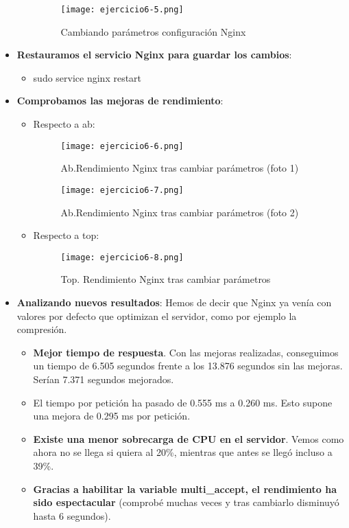\begin{itemize}
\begin{itemize}
			\begin{figure}[H] 
				\centering
				\texttt{[image: ejercicio6-5.png]} 
				\label{figura31} 
				\caption{Cambiando parámetros configuración Nginx}
			\end{figure} 	
			\end{itemize}
		\item \textbf{Restauramos el servicio Nginx para guardar los cambios}:
		\begin{itemize}
			\item sudo service nginx restart
		\end{itemize}
		\item \textbf{Comprobamos las mejoras de rendimiento}:
			\begin{itemize}
				\item Respecto a ab:
				\begin{figure}[H] 
					\centering
					\texttt{[image: ejercicio6-6.png]} 
					\label{figura32} 
					\caption{Ab.Rendimiento Nginx tras cambiar parámetros (foto 1)}
				\end{figure}
				\begin{figure}[H] 
					\centering
					\texttt{[image: ejercicio6-7.png]} 
					\label{figura33} 
					\caption{Ab.Rendimiento Nginx tras cambiar parámetros (foto 2)}
				\end{figure}
			\end{itemize}
			\begin{itemize}
				\item Respecto a top:
				\begin{figure}[H] 
					\centering
					\texttt{[image: ejercicio6-8.png]} 
					\label{figura34} 
					\caption{Top. Rendimiento Nginx tras cambiar parámetros}
				\end{figure}
			\end{itemize}
		\item \textbf{Analizando nuevos resultados}: Hemos de decir que Nginx ya venía con valores por defecto que optimizan el servidor, como por ejemplo la compresión. 
			\begin{itemize}
				\item \textbf{Mejor tiempo de respuesta}. Con las mejoras realizadas, conseguimos un tiempo de 6.505 segundos frente a los 13.876 segundos sin las mejoras. Serían 7.371 segundos mejorados. 
				\item El tiempo por petición ha pasado de 0.555 ms a 0.260 ms. Esto supone una mejora de 0.295 ms por petición.
				\item \textbf{Existe una menor sobrecarga de CPU en el servidor}. Vemos como ahora no se llega si quiera al 20\%, mientras que antes se llegó incluso a 39\%.
				\item \textbf{Gracias a habilitar la variable multi\_accept, el rendimiento ha sido espectacular} (comprobé muchas veces y tras cambiarlo disminuyó hasta 6 segundos).
				
			\end{itemize}
	\end{itemize}
	

